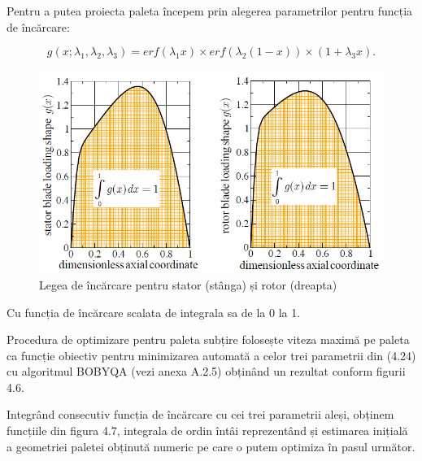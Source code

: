 Pentru a putea proiecta paleta începem prin alegerea parametrilor pentru funcția de încărcare:

\begin{equation}
g(x; \lambda_1, \lambda_2, \lambda_3) = erf(\lambda_1 x) \times erf( \lambda_2( 1 - x )) \times (1 + \lambda_3x ).
\end{equation}

\begin{figure}[!h]
  \centering
    \includegraphics[scale=0.5]{figures/loading-shape.PNG}
  \caption{Legea de încărcare pentru stator (stânga) și rotor (dreapta)}
\end{figure}

Cu funcția de încărcare scalata de integrala sa de la 0 la 1.

Procedura de optimizare pentru paleta subțire folosește viteza maximă pe paleta ca funcție obiectiv pentru minimizarea automată a celor trei parametrii din (4.24) cu algoritmul BOBYQA (vezi anexa A.2.5) \cite{powell2009bobyqa} obținând un rezultat conform figurii 4.6.

Integrând consecutiv funcția de încărcare cu cei trei parametrii aleși, obținem funcțiile din figura 4.7, integrala de ordin întâi reprezentând și estimarea inițială a geometriei paletei obținută numeric pe care o putem optimiza în pasul următor.

